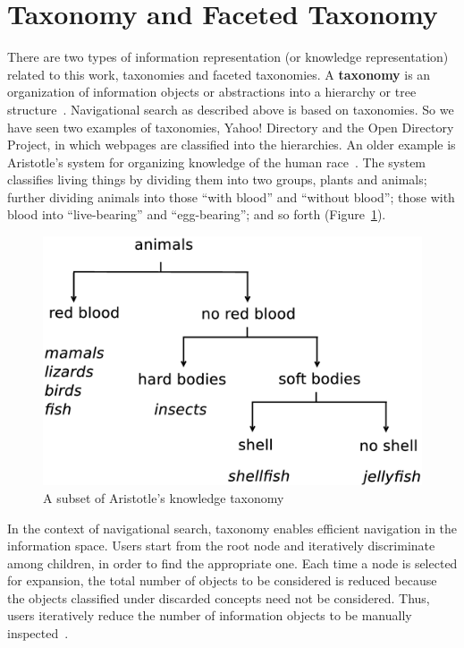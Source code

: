 \section{Taxonomy and Faceted Taxonomy}
There are two types of information representation (or knowledge representation) related to this work, taxonomies and faceted taxonomies. A \textbf{taxonomy} is an organization of information objects or abstractions into a hierarchy or tree structure~\cite{tunkelang2009faceted}. Navigational search as described above is based on taxonomies. So we have seen two examples of taxonomies, Yahoo! Directory and the Open Directory Project, in which webpages are classified into the hierarchies. An older example is Aristotle's system for organizing knowledge of the human race~\cite{tunkelang2009faceted}. The system classifies living things by dividing them into two groups, plants and animals; further dividing animals into those ``with blood'' and ``without blood''; those with blood into ``live-bearing'' and ``egg-bearing''; and so forth (Figure~\ref{fig:bg-aristotle}).

\begin{figure}[ht!]
\centering
\includegraphics[width=0.95\columnwidth]{drawing/aristotle.eps}
\caption{A subset of Aristotle's knowledge taxonomy~\cite{tunkelang2009faceted}}
\label{fig:bg-aristotle}
\end{figure}

In the context of navigational search, taxonomy enables efficient navigation in the information space. Users start from the root node and iteratively discriminate among children, in order to find the appropriate one. Each time a node is selected for expansion, the total number of objects to be considered is reduced because the objects classified under discarded concepts need not be considered. Thus, users iteratively reduce the number of information objects to be manually inspected~\cite{sacco2009dynamic}.

